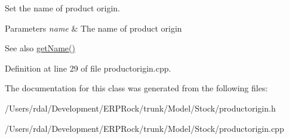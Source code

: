 \-Set the name of product origin. 


\begin{DoxyParams}{\-Parameters}
{\em name} & \-The name of product origin \\
\hline
\end{DoxyParams}
\begin{DoxySeeAlso}{\-See also}
\hyperlink{class_product_origin_a26e9b4245f4225b62e686d9af4175d1f}{get\-Name()} 
\end{DoxySeeAlso}


\-Definition at line 29 of file productorigin.\-cpp.



\-The documentation for this class was generated from the following files\-:\begin{DoxyCompactItemize}
\item 
/\-Users/rdal/\-Development/\-E\-R\-P\-Rock/trunk/\-Model/\-Stock/productorigin.\-h\item 
/\-Users/rdal/\-Development/\-E\-R\-P\-Rock/trunk/\-Model/\-Stock/productorigin.\-cpp\end{DoxyCompactItemize}
